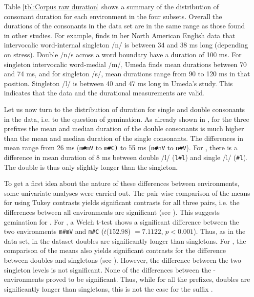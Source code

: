 Table \ref{tbl:Corpus raw duration} shows a summary of the distribution of consonant duration for each environment in the four subsets. Overall the durations of the consonants in the data set are in the same range as those found in other studies. For example, \citet[Tables II and X]{Umeda.1977} finds in her North American English data that intervocalic word-internal singleton /n/ is between 34 and 38 ms long (depending on stress). 
Double /n/s across a word boundary have a duration of 100 ms. For singleton intervocalic word-medial /m/, Umeda finds mean durations between 70 and 74 ms, and for singleton /s/, mean durations range from 90 to 120 ms in that position. Singleton /l/ is between 40 and 47 ms long in Umeda's study. This indicates that the data and the durational measurements are valid.

Let us now turn to the distribution of duration for single and double consonants in the data, i.e. to the question of gemination.  As already shown in , for the three prefixes the mean and median duration of the double consonants is much higher than the mean and median duration of the single consonants. The differences in mean range from 26 ms (\texttt{m\#mV} to  \texttt{m\#C)} to 55 ms (\texttt{n\#nV} to  \texttt{n\#V}). For , there is a difference in mean duration of 8 ms between double /l/ (\texttt{l\#l}) and single /l/ (\texttt{\#l}). The double is thus only slightly longer than the singleton.
  
  



To get a first idea about the nature of these differences between environments, some univariate analyses were carried out. The pair-wise comparison of the means for  using Tukey contrasts yields significant contrasts for all three pairs, i.e. the differences between all environments are significant (see ). This suggests gemination for . 
For , a Welch t-test shows a significant difference between the two environments \texttt{m\#mV} and \texttt{m\#C} ($t$($152.98$) $=7.1122$, $p< 0.001$). 
Thus, as in the data set, in the dataset doubles are significantly longer than singletons.
For , the comparison of the means also yields significant contrasts for the difference between doubles and singletons (see ). However, the difference between the two singleton levels is not significant. None of the differences between the -environments proved to be significant. Thus, while for all the prefixes, doubles are significantly longer than singletons, this is not the case for the suffix .


